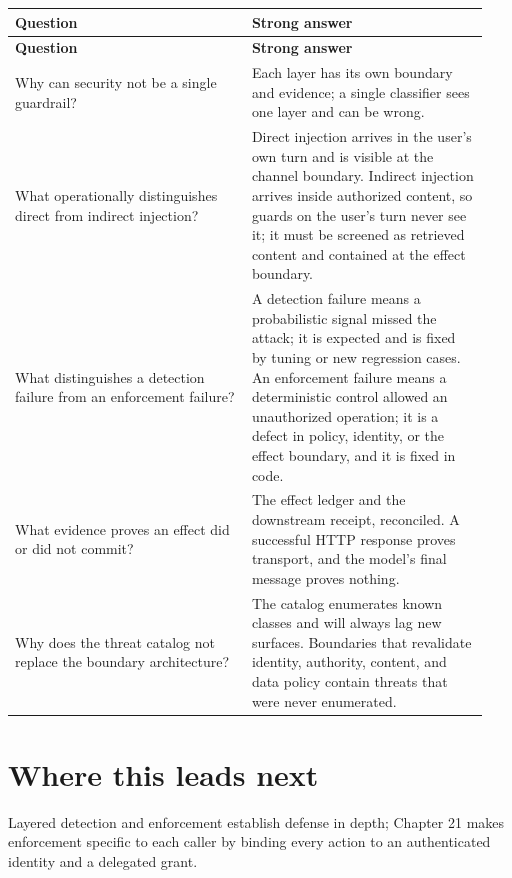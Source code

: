\BookTableStart
\small
\begin{longtable}{@{}Y{0.4700\linewidth}Y{0.4700\linewidth}@{}}
\color{white}\bfseries \textbf{Question} & \color{white}\bfseries \textbf{Strong answer} \\
\endfirsthead
{}
\color{white}\bfseries \textbf{Question} & \color{white}\bfseries \textbf{Strong answer} \\
\endhead
Why can security not be a single guardrail? & Each layer has its own boundary and evidence; a single classifier sees one layer and can be wrong. \\
What operationally distinguishes direct from indirect injection? & Direct injection arrives in the user's own turn and is visible at the channel boundary. Indirect injection arrives inside authorized content, so guards on the user's turn never see it; it must be screened as retrieved content and contained at the effect boundary. \\
What distinguishes a detection failure from an enforcement failure? & A detection failure means a probabilistic signal missed the attack; it is expected and is fixed by tuning or new regression cases. An enforcement failure means a deterministic control allowed an unauthorized operation; it is a defect in policy, identity, or the effect boundary, and it is fixed in code. \\
What evidence proves an effect did or did not commit? & The effect ledger and the downstream receipt, reconciled. A successful HTTP response proves transport, and the model's final message proves nothing. \\
Why does the threat catalog not replace the boundary architecture? & The catalog enumerates known classes and will always lag new surfaces. Boundaries that revalidate identity, authority, content, and data policy contain threats that were never enumerated. \\
\end{longtable}
\BookTableEnd

\section{Where this leads next}

Layered detection and enforcement establish defense in depth; Chapter 21 makes enforcement specific to each caller by binding every action to an authenticated identity and a delegated grant.\par


